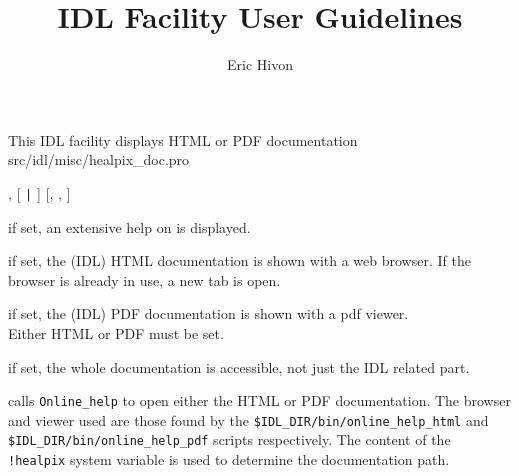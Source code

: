 


\sloppy



\title{\healpix IDL Facility User Guidelines}
 \section[healpix\_doc: PDF and HTML documentation]{ }
\label{idl:healpix_doc}
\author{Eric Hivon}




\begin{facility}
{This IDL facility displays HTML or PDF \healpix documentation}
{src/idl/misc/healpix\_doc.pro}
\end{facility}

\begin{IDLformat}
{\thedocid, [%
 {\tt |} %
] [, %
,  %
] }
\end{IDLformat}

\begin{keywords}
  \begin{kwlist}{} %
    \item[HELP\mytarget{idl:healpix_doc:HELP}%
=] if set, an extensive help on \thedocid{} is displayed.
    \item[HTML\mytarget{idl:healpix_doc:HTML}%
=]  if set, the \healpix (IDL) HTML documentation is shown with a web browser.
            If the browser is already in use, a new tab is open.
    \item[PDF\mytarget{idl:healpix_doc:PDF}%
=]   if set, the \healpix (IDL) PDF documentation is shown with a pdf viewer.\\
            Either HTML or PDF must be set.
    \item[WHOLE\mytarget{idl:healpix_doc:WHOLE}%
=]  if set, the whole \healpix documentation is accessible,
              not just the IDL related part.
  \end{kwlist}
\end{keywords}  

\begin{codedescription}
{\thedocid{}  calls {\tt Online\_help} to open either the HTML or PDF \healpix
documentation. The browser and viewer used are those found by the 
{\tt \$IDL\_DIR/bin/online\_help\_html} and 
{\tt \$IDL\_DIR/bin/online\_help\_pdf} scripts respectively.
The content of the {\tt !healpix} system variable is used to
determine the documentation path.}
\end{codedescription}



